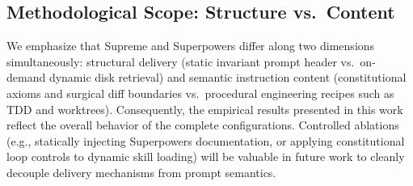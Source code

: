 \subsection{Methodological Scope: Structure vs.\ Content}
We emphasize that Supreme and Superpowers differ along two dimensions simultaneously: structural delivery (static invariant prompt header vs.\ on-demand dynamic disk retrieval) and semantic instruction content (constitutional axioms and surgical diff boundaries vs.\ procedural engineering recipes such as TDD and worktrees). Consequently, the empirical results presented in this work reflect the overall behavior of the complete configurations. Controlled ablations (e.g., statically injecting Superpowers documentation, or applying constitutional loop controls to dynamic skill loading) will be valuable in future work to cleanly decouple delivery mechanisms from prompt semantics.
